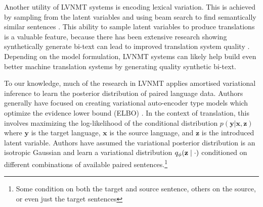 Another utility of \ac{LVNMT} systems is encoding lexical variation. This is achieved by sampling from the latent variables and using beam search to find semantically similar sentences \cite{schulz2018StochasticDecoder, shen2019diverse}. This ability to sample latent variables to produce translations is a valuable feature, because there has been extensive research showing synthetically generate bi-text can lead to improved translation system quality \cite{sennrich2015ImprovingNMT, edunov2018understandigBackTrans}. Depending on the model formulation, \ac{LVNMT} systems can likely help build even better machine translation systems by generating quality synthetic bi-text. 


To our knowledge, much of the research in \ac{LVNMT} applies amortised variational inference to learn the posterior distribution of paired language data. Authors generally have focused on creating variational auto-encoder type models which optimize the evidence lower bound (ELBO) \cite{ kingma2014autoencodingVB, rezende2014stochasticBackprop}. In the context of translation, this involves maximizing the log-likelihood of the conditional distribution $p(\textbf{y} | \textbf{x}, \textbf{z})$ where $\textbf{y}$ is the target language, $\textbf{x}$ is the source language, and $\textbf{z}$ is the introduced latent variable. Authors have assumed the variational posterior distribution is an isotropic Gaussian and learn a variational distribution $q_{\phi}(\textbf{z}\; | \;{\cdot})$ conditioned on different combinations of available paired sentences.\footnote{ Some condition on both the target and source sentence, others on the source, or even just the target sentences} 

